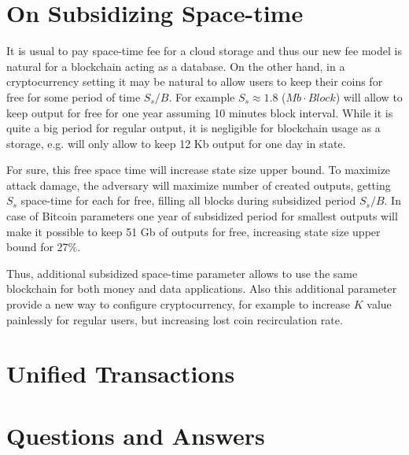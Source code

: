 \documentclass[]{llncs}   %
\newcommand{\authnote}[2]{\marginpar{\parbox{\marginparwidth}{\tiny %
  \textsf{#1 {\textcolor{blue}{notes: #2}}}}}%
  \textcolor{blue}{\textbf{\dag}}}
\newcommand{\authnote}[2]{
  \textsf{#1 \textcolor{blue}{: #2}}}
\newcommand{\authnote}[2]{}
\newcommand{\knote}[1]{{\authnote{\textcolor{green}{Alex notes}}{#1}}}
\newcommand{\state}{state}
\begin{document}
\section{On Subsidizing Space-time}
\label{sec:subsidy}

It is usual to pay space-time fee for a cloud storage and thus our new fee model is natural for a blockchain acting as a database. On the other hand, in a cryptocurrency setting it may be natural to allow users to keep their coins for free for some period of time $S_s/B$. For example $S_s \approx 1.8$ ($Mb \cdot Block$) will allow to keep output for free for one year assuming 10 minutes block interval. While it is quite a big period for regular output, it is negligible for blockchain usage as a storage, e.g. will only allow to keep 12 Kb output for one day in \state{}.

For sure, this free space time will increase \state{} size upper bound. To maximize attack damage, the adversary will maximize number of created outputs, getting $S_s$ space-time for each for free, filling all blocks during subsidized period $S_s/B$. In case of Bitcoin parameters one year of subsidized period for smallest outputs will make it possible to keep 51 Gb of outputs for free, increasing \state{} size upper bound for 27\%.

Thus, additional subsidized space-time parameter allows to use the same blockchain for both money and data applications. Also this additional parameter provide a new way to configure cryptocurrency, for example to increase $K$ value painlessly for regular users, but increasing lost coin recirculation rate.

\section{Unified Transactions}

\knote{We can throw away special coinbase transactions getting unified transaction format, by requiring fees to be paid in form of anyone-can-spend output, and by creating constant rewards in predefined and hard-coded pre-genesis state, where a reward for a certain height is an output in the pre-genesis UTXO spendable only at this height.}

\section{Questions and Answers}
\end{document}
